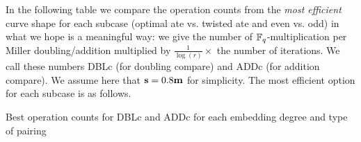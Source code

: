 In the following table we compare the operation counts from the \emph{most efficient} 
curve shape for each subcase
(optimal ate vs. twisted ate and even vs. odd)
in what we hope is a meaningful way:
we give the number of $\mathbb{F}_{q}$-multiplication per Miller doubling/addition multiplied by 
$\frac{1}{\log(r)} \times $ the number of iterations. We call these numbers DBLc 
(for doubling compare) and ADDc (for addition compare).
We assume here that $\textbf{s} = 0.8\textbf{m}$ for simplicity.
The most efficient option for each subcase is as follows.

\begin{table}[h]
\centering
\caption{Best operation counts for DBLc and ADDc for each embedding degree and type of pairing}


\end{table}
